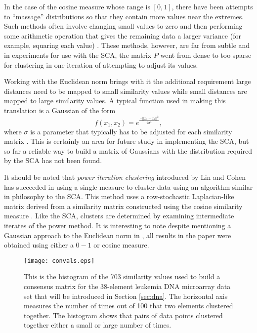 \documentclass[final]{siamltex}
\begin{document}
In the case of the cosine measure whose range is $[0,1]$, there have been attempts to ``massage'' distributions so that they contain more values near the extremes. Such methods often involve changing small values to zero and then performing some arithmetic operation that gives the remaining data a larger variance (for example, squaring each value) \cite{vandongen2000gcf}. These methods, however, are far from subtle and in experiments for use with the SCA, the matrix $P$ went from dense to too sparse for clustering in one iteration of attempting to adjust its values.

Working with the Euclidean norm brings with it the additional requirement large distances need to be mapped to small similarity values while small distances are mapped to large similarity values. A typical function used in making this translation is a Gaussian of the form
\[
f({x}_{1},{x}_{2}) = e^{\frac{-||x_{1}-x_{2}||^{2}}{2\sigma^{2}}},
\]
where $\sigma$ is a parameter that typically has to be adjusted for each similarity matrix \cite{mouysset2008hpc}. This is certainly an area for future study in implementing the SCA, but so far a reliable way to build a matrix of Gaussians with the distribution required by the SCA has not been found.

It should be noted that \emph{power iteration clustering} introduced by Lin and Cohen has succeeded in using a single measure to cluster data using an algorithm similar in philosophy to the SCA. This method uses a row-stochastic Laplacian-like matrix derived from a similarity matrix constructed using the cosine similarity measure \cite{lin2010pic, lin2010vfm, meila2001rwv}. Like the SCA, clusters are determined by examining intermediate iterates of the power method. It is interesting to note despite mentioning a Gaussian approach to the Euclidean norm in \cite{lin2010pic}, all results in the paper were obtained using either a $0-1$ or cosine measure.

\begin{figure}[ht]
\centering
\texttt{[image: convals.eps]}
\caption{This is the histogram of the 703 similarity values used to build a consensus matrix for the 38-element leukemia DNA microarray data set that will be introduced in Section \ref{sec:dna}. The horizontal axis measures the number of times out of 100 that two elements clustered together. The histogram shows that pairs of data points clustered together either a small or large number of times.}
\label{fig:scm}
\end{figure}
\end{document}
